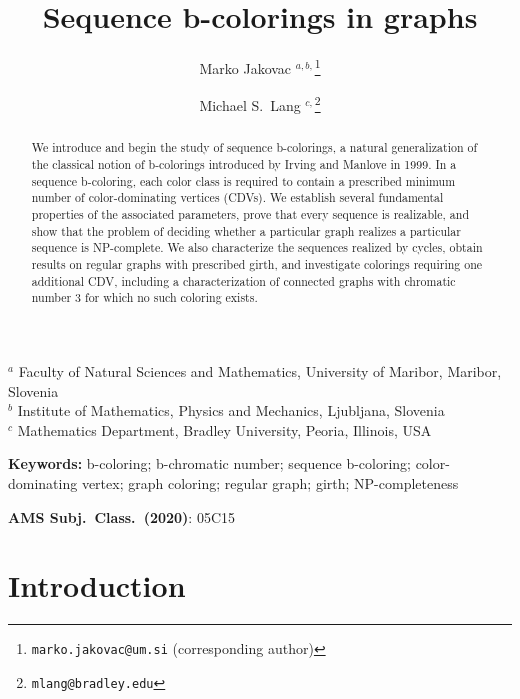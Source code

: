 \documentclass{article}
\theoremstyle{definition}
\begin{document}
\title{Sequence b-colorings in graphs}

\author{
Marko Jakovac $^{a,b,}$\thanks{\texttt{marko.jakovac@um.si} (corresponding author)}
\and Michael S.\ Lang $^{c,}$\thanks{\texttt{mlang@bradley.edu}} 
}

\maketitle

\begin{center}
$^a$ Faculty of Natural Sciences and Mathematics, University of Maribor, Maribor, Slovenia \\
\medskip
$^b$ Institute of Mathematics, Physics and Mechanics, Ljubljana, Slovenia\\
\medskip
$^c$ Mathematics Department, Bradley University, Peoria, Illinois, USA\\
\medskip
\end{center}

\begin{abstract}
We introduce and begin the study of sequence b-colorings, a natural generalization of the classical notion of b-colorings introduced by Irving and Manlove in 1999. In a sequence b-coloring, each color class is required to contain a prescribed minimum number of color-dominating vertices (CDVs). We establish several fundamental properties of the associated parameters, prove that every sequence is realizable, and show that the problem of deciding whether a particular graph realizes a particular sequence is NP-complete. We also characterize the sequences realized by cycles, obtain results on regular graphs with prescribed girth, and investigate colorings requiring one additional CDV, including a characterization of connected graphs with chromatic number $3$ for which no such coloring exists.
\end{abstract}

\vspace{5mm}

\noindent
{\bf Keywords:} b-coloring; b-chromatic number; sequence b-coloring; color-dominating vertex; graph coloring; regular graph; girth; NP-completeness

\vspace{5mm}

\noindent
{\bf AMS Subj.\ Class.\ (2020)}: 05C15

\section{Introduction}
\end{document}
